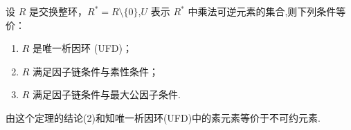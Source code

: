 \documentclass[../../main.tex]{subfiles}%
\begin{document}
\begin{theorem}\label{theorem:UFD的充要条件}
设 \( R \) 是交换整环，\( R^* = R \setminus \{0\} \),\( U \) 表示 \( R^* \) 中乘法可逆元素的集合,则下列条件等价：
\begin{enumerate}[(1)]
\item\label{theorem:UFD的充要条件-1} \( R \) 是唯一析因环 (UFD)；
\item\label{theorem:UFD的充要条件-2} \( R \) 满足因子链条件与素性条件；
\item\label{theorem:UFD的充要条件-3} \( R \) 满足因子链条件与最大公因子条件.
\end{enumerate}
\end{theorem}
\begin{remark}
由这个定理的结论(2)和知唯一析因环(UFD)中的素元素等价于不可约元素.
\end{remark}
\end{document}
